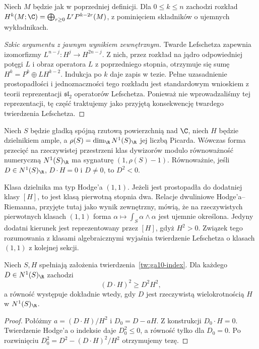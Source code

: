 \begin{twierdzenie}
Niech $M$ będzie jak w poprzedniej definicji.
Dla $0\le k\le n$ zachodzi rozkład
$H^k(M;\C)=\bigoplus_{r\ge0}L^rP^{k-2r}(M)$,
z pominięciem składników o ujemnych wykładnikach.
\end{twierdzenie}
\begin{proof}[Szkic argumentu z jawnym wynikiem zewnętrznym]
Twarde Lefschetza zapewnia izomorfizmy
$L^{n-j}\colon H^j\to H^{2n-j}$.
Z nich, przez rozkład na jądro odpowiedniej potęgi $L$
i obraz operatora $L$ z poprzedniego stopnia,
otrzymuje się sumę $H^k=P^k\oplus LH^{k-2}$.
Indukcja po $k$ daje zapis w tezie. Pełne uzasadnienie
prostopadłości i jednoznaczności tego rozkładu jest
standardowym wnioskiem z teorii reprezentacji $\mathfrak{sl}_2$
operatorów Lefschetza. Ponieważ nie wprowadzaliśmy tej
reprezentacji, tę część traktujemy jako przyjętą
konsekwencję twardego twierdzenia Lefschetza.
\end{proof}

\begin{twierdzenie}
\label{tw:ga10-index}
Niech $S$ będzie gładką spójną rzutową powierzchnią
nad $\C$, niech $H$ będzie dzielnikiem ample, a
$\rho(S)=\dim_{\R}N^1(S)_{\R}$ jej liczbą Picarda.
Wówczas forma przecięć na rzeczywistej przestrzeni klas
dywizorów modulo równoważność numeryczną
$N^1(S)_{\R}$ ma sygnaturę $(1,\rho(S)-1)$.
Równoważnie, jeśli $D\in N^1(S)_{\R}$,
$D\cdot H=0$ i $D\ne0$, to $D^2<0$.
\end{twierdzenie}

\begin{uwaga}
Klasa dzielnika ma typ Hodge'a $(1,1)$.
Jeżeli jest prostopadła do dodatniej klasy $[H]$, to jest
klasą pierwotną stopnia dwa. Relacje dwuliniowe
Hodge'a--Riemanna, przyjęte tutaj jako wynik zewnętrzny,
mówią, że na rzeczywistych pierwotnych klasach $(1,1)$
forma $\alpha\mapsto\int_S\alpha\wedge\alpha$ jest ujemnie
określona. Jedyny dodatni kierunek jest reprezentowany
przez $[H]$, gdyż $H^2>0$. Związek tego rozumowania
z klasami algebraicznymi wyjaśnia twierdzenie Lefschetza
o klasach $(1,1)$ z kolejnej sekcji.
\end{uwaga}

\begin{stwierdzenie}
\label{st:ga10-hodge-ineq}
Niech $S,H$ spełniają założenia
twierdzenia~\ref{tw:ga10-index}. Dla każdego
$D\in N^1(S)_{\R}$ zachodzi
\[
 (D\cdot H)^2\ge D^2H^2,
\]
a równość występuje dokładnie wtedy, gdy $D$ jest
rzeczywistą wielokrotnością $H$ w $N^1(S)_{\R}$.
\end{stwierdzenie}
\begin{proof}
Połóżmy $a=(D\cdot H)/H^2$ i $D_0=D-aH$.
Z konstrukcji $D_0\cdot H=0$.
Twierdzenie Hodge'a o indeksie daje $D_0^2\le0$,
a równość tylko dla $D_0=0$. Po rozwinięciu
$D_0^2=D^2-(D\cdot H)^2/H^2$ otrzymujemy tezę.
\end{proof}

